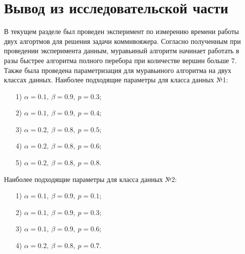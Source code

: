 \section*{Вывод из исследовательской части}

В текущем разделе был проведен эксперимент по измерению времени работы двух алгортмов для решения задачи коммивояжера. 
Согласно полученным при проведении эксперимента данным, муравьиный алгоритм начинает работать в разы быстрее алгоритма полного перебора при количестве вершин больше 7. 
Также была проведена параметризация для муравьиного алгоритма на двух классах данных. 
Наиболее подходящие параметры для класса данных №1:
\begin{enumerate}
\item[1)] $\alpha = 0.1,~\beta = 0.9,~p = 0.3$;
\item[2)] $\alpha = 0.1,~\beta = 0.9,~p = 0.4$;
\item[3)] $\alpha = 0.2,~\beta = 0.8,~p = 0.5$;
\item[4)] $\alpha = 0.2,~\beta = 0.8,~p = 0.6$;
\item[5)] $\alpha = 0.2,~\beta = 0.8,~p = 0.8$.
\end{enumerate}
Наиболее подходящие параметры для класса данных №2:
\begin{enumerate}
\item[1)] $\alpha = 0.1,~\beta = 0.9,~p = 0.1$;
\item[2)] $\alpha = 0.1,~\beta = 0.9,~p = 0.3$;
\item[3)] $\alpha = 0.1,~\beta = 0.9,~p = 0.6$;
\item[4)] $\alpha = 0.2,~\beta = 0.8,~p = 0.7$.
\end{enumerate}

